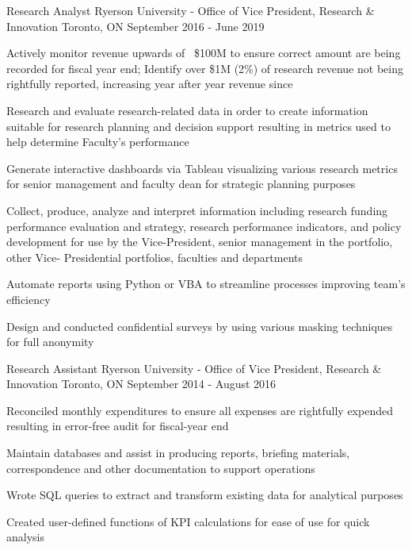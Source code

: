 \begin{cventries}
  \cventry
    {Research Analyst} %
    {Ryerson University - Office of Vice President, Research \& Innovation} %
    {Toronto, ON} %
    {September 2016 - June 2019} %
    {
      \begin{cvitems} %
        \item {Actively monitor revenue upwards of ~\$100M to ensure correct amount are being recorded for fiscal year end; Identify over \$1M (2\%) of research revenue not being rightfully reported, increasing year after year revenue since}
        \item {Research and evaluate research-related data in order to create information suitable for research planning and decision support resulting in metrics used to help determine Faculty's performance}
        \item {Generate interactive dashboards via Tableau visualizing various research metrics for senior management and faculty dean for strategic planning purposes}
        \item {Collect, produce, analyze and interpret information including research funding performance evaluation and strategy, research performance indicators, and policy development for use by the Vice-President, senior management in the portfolio, other Vice- Presidential portfolios, faculties and departments}
        \item {Automate reports using Python or VBA to streamline processes improving team's efficiency}
        \item {Design and conducted confidential surveys by using various masking techniques for full anonymity}
        {}
      \end{cvitems}
    }

 
  \cventry
    {Research Assistant} %
    {Ryerson University - Office of Vice President, Research \& Innovation} %
    {Toronto, ON} %
    {September 2014 - August 2016} %
    {
      \begin{cvitems} %
        \item {Reconciled monthly expenditures to ensure all expenses are rightfully expended resulting in error-free audit for fiscal-year end}
        \item {Maintain databases and assist in producing reports, briefing materials, correspondence and other documentation to support operations}
        \item {Wrote SQL queries to extract and transform existing data for analytical purposes}
        \item {Created user-defined functions of KPI calculations for ease of use for quick analysis}
      \end{cvitems}
    }

\end{cventries}
